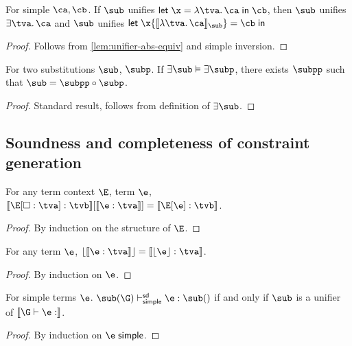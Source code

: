 \documentclass[acmsmall,screen,nonacm,review]{acmart}
\begin{document}
\begin{lemma}
  For simple $\ca, \cb$.
  If $\sub$ unifies $\clet \x \tv \ca \cb$, then
  $\sub$ unifies $\cexists \tv \ca$ and
  $\sub$ unifies $\cletin \x {\csem {\cabs \tv \ca}_\sub} \cb$
  \begin{proof}
    Follows from \cref{lem:unifier-abs-equiv} and simple inversion.
  \end{proof}
\end{lemma}

\begin{lemma}
  \label{lem:mgus}
  For two substitutions $\sub$, $\subp$. If $\exists \sub \centails \exists \subp$, there exists
  $\subpp$ such that $\sub = \subpp \compose \subp$.
  \begin{proof}
    Standard result, follows from definition of $\exists \sub$.
  \end{proof}
\end{lemma}

\subsection{Soundness and completeness of constraint generation}

\begin{lemma}
  \label{lem:ctxt-gen-correctness}
  For any term context $\E$, term $\e$, $\ctxinfer \E \tv \tvb \where{\cinfer \e \tv} = \cinfer {\E\where{\e}} \tvb$.
  \begin{proof}
    By induction on the structure of $\E$.
  \end{proof}
\end{lemma}

\begin{lemma}
  \label{lem:erasure-constraint-gen}
  For any term $\e$, $\cerase {\cinfer \e \tv} = \cinfer {\eerase \e} \tv$.
  \begin{proof}
    By induction on $\e$.
  \end{proof}
\end{lemma}

\begin{lemma}
  \label{lem:simple-soundness-completeness}
  For simple terms $\e$.
  $\sub(\G) \thsimplesd \e : \sub(\t)$ if and only if $\sub$ is a unifier of $\csem {\G \th \e : \t}$.
  \begin{proof}
    By induction on $\e \simple$.
  \end{proof}
\end{lemma}
\end{document}
